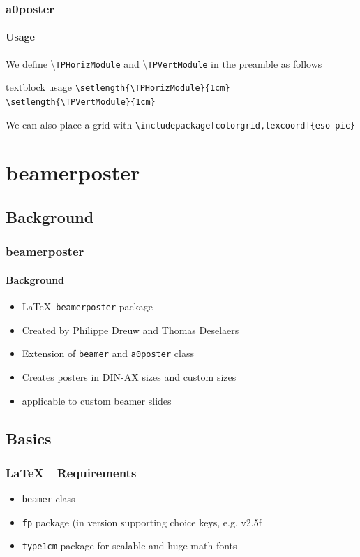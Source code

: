 \documentclass[11pt]{beamer}
\renewcommand{\L}{\LaTeX\ }
\begin{document}
\begin{frame}
\frametitle{a0poster}\framesubtitle{Usage}
 We define \textbackslash \verb|TPHorizModule| and \textbackslash \verb|TPVertModule| in the preamble as follows
			\begin{block}{textblock usage}
				\texttt{\textbackslash setlength\{\textbackslash TPHorizModule\}\{1cm\}}\\
				\texttt{\textbackslash setlength\{\textbackslash TPVertModule\}\{1cm\}}	
			\end{block}	
We can also place a grid with \texttt{\textbackslash includepackage[colorgrid,texcoord]\{eso-pic\}}	
\end{frame}


\section{beamerposter}
\subsection{Background}
\begin{frame}
\frametitle{beamerposter}\framesubtitle{Background}
			\begin{itemize}
				\item \L \verb|beamerposter| package
				\item Created by Philippe Dreuw and Thomas Deselaers
				\item Extension of \verb|beamer|  and \verb|a0poster| class
				\item Creates posters in DIN-AX sizes and custom sizes
				\item applicable to custom beamer slides
			\end{itemize}
\end{frame}

\subsection{Basics}
\begin{frame}
\frametitle{\L\ Requirements}%
			\begin{itemize}
				\item \verb|beamer| class
				\item \verb|fp| package (in version supporting choice keys, e.g. v2.5f
				\item \verb|type1cm| package for scalable and huge math fonts
			\end{itemize}
\end{frame}
 
\end{document}
